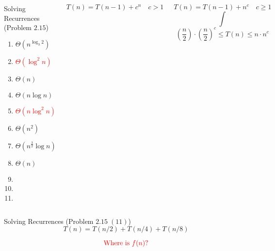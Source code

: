 \begin{frame}{}
  \begin{columns}
      \begin{exampleblock}{Solving Recurrences (Problem $2.15$)}
	\begin{enumerate}[(1)]
	  \item $\Theta(n^{\log_3 2})$
	  \item \textcolor{red}{$\Theta(\log^2 n)$}
	  \item $\Theta(n)$
	  \item $\Theta(n \log n)$
	  \item \textcolor{red}{$\Theta(n \log^2 n)$}
	  \item $\Theta(n^2)$
	  \item $\Theta(n^{\frac{3}{2}}\log n)$
	  \item $\Theta(n)$
	  \item {}
	  \item {}
	  \item \purple{$\cdots$}
	\end{enumerate}
      \end{exampleblock}
      \[
		T(n) = T(n-1) + c^n \quad c > 1
      \]

      \[
		T(n) = T(n-1) + n^c \quad c \ge 1
      \]
	  \pause
	  \[
		\int
	  \]
	  \pause
	  \[
		(\frac{n}{2}) \cdot (\frac{n}{2})^{c} \le T(n) \le n \cdot n^c
	  \]
  \end{columns}
\end{frame}

\begin{frame}[fragile]{}
  \begin{exampleblock}{Solving Recurrences (Problem $2.15\; (11)$)}
    \[
      T(n) = T(n/2) + T(n/4) + T(n/8)
    \]
  \end{exampleblock}

  \pause
  \vspace{0.50cm}
  \[
    \textcolor{red}{\text{Where is } f(n)?}
  \]
\end{frame}

